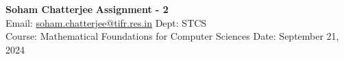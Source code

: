 \documentclass[a4paper, 11pt]{article}
\begin{document}
	
	
	{\noindent \large\textbf{Soham Chatterjee} \hfill \textbf{Assignment - 2}\\
		Email: \href{soham.chatterjee@tifr.res.in}{soham.chatterjee@tifr.res.in} \hfill Dept: STCS\\
		\normalsize Course: Mathematical Foundations for Computer Sciences \hfill Date: September 21, 2024}
	
	
\end{document}
